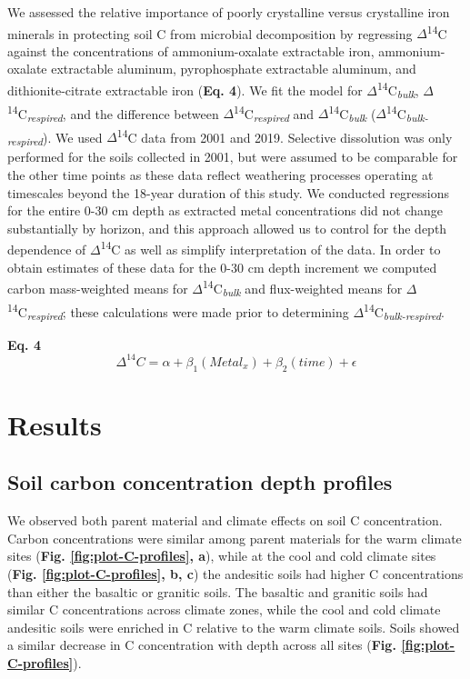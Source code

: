 \documentclass[english,man,floatsintext]{apa6}
\begin{document}
We assessed the relative importance of poorly crystalline versus crystalline iron minerals in protecting soil C from microbial decomposition by regressing \(\Delta\)\textsuperscript{14}C against the concentrations of ammonium-oxalate extractable iron, ammonium-oxalate extractable aluminum, pyrophosphate extractable aluminum, and dithionite-citrate extractable iron (\textbf{Eq. 4}). We fit the model for \(\Delta\)\textsuperscript{14}C\textsubscript{\emph{bulk}}, \(\Delta\)\textsuperscript{14}C\textsubscript{\emph{respired}}, and the difference between \(\Delta\)\textsuperscript{14}C\textsubscript{\emph{respired}} and \(\Delta\)\textsuperscript{14}C\textsubscript{\emph{bulk}} (\(\Delta\)\textsuperscript{14}C\textsubscript{\emph{bulk-respired}}). We used \(\Delta\)\textsuperscript{14}C data from 2001 and 2019. Selective dissolution was only performed for the soils collected in 2001, but were assumed to be comparable for the other time points as these data reflect weathering processes operating at timescales beyond the 18-year duration of this study. We conducted regressions for the entire 0-30 cm depth as extracted metal concentrations did not change substantially by horizon, and this approach allowed us to control for the depth dependence of \(\Delta\)\textsuperscript{14}C as well as simplify interpretation of the data. In order to obtain estimates of these data for the 0-30 cm depth increment we computed carbon mass-weighted means for \(\Delta\)\textsuperscript{14}C\textsubscript{\emph{bulk}} and flux-weighted means for \(\Delta\)\textsuperscript{14}C\textsubscript{\emph{respired}}; these calculations were made prior to determining \(\Delta\)\textsuperscript{14}C\textsubscript{\emph{bulk-respired}}.

\textbf{Eq. 4}
\[\Delta^{14}C = \alpha + \beta_{1}(Metal_{x}) + \beta_{2}(time) + \epsilon\]

\hypertarget{results}{%
\section{Results}\label{results}}

\hypertarget{soil-carbon-concentration-depth-profiles}{%
\subsection{Soil carbon concentration depth profiles}\label{soil-carbon-concentration-depth-profiles}}

We observed both parent material and climate effects on soil C concentration. Carbon concentrations were similar among parent materials for the warm climate sites (\textbf{Fig. \ref{fig:plot-C-profiles}, a}), while at the cool and cold climate sites (\textbf{Fig. \ref{fig:plot-C-profiles}, b, c}) the andesitic soils had higher C concentrations than either the basaltic or granitic soils. The basaltic and granitic soils had similar C concentrations across climate zones, while the cool and cold climate andesitic soils were enriched in C relative to the warm climate soils. Soils showed a similar decrease in C concentration with depth across all sites (\textbf{Fig. \ref{fig:plot-C-profiles}}).
\end{document}
